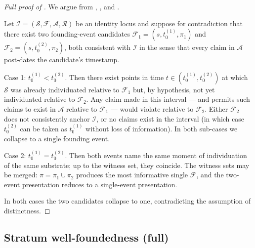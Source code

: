\documentclass[11pt,a4paper,parskip=half-,DIV=12,headings=standardclasses]{scrartcl}
\theoremstyle{ncthm}
\theoremstyle{ncdef}
\newcommand{\identity}{\mathcal{I}}
\newcommand{\substrate}{\mathcal{S}}
\newcommand{\founding}{\mathcal{F}}
\newcommand{\accretion}{\mathcal{A}}
\newcommand{\relations}{\mathcal{R}}
\begin{document}
\begin{proof}[Full proof of ]
We argue from , ,
and .

Let $\identity = (\substrate, \founding, \accretion, \relations)$ be
an identity locus and suppose for contradiction that there exist two
founding-event candidates $\founding_1 = (s, t_0^{(1)}, \pi_1)$ and
$\founding_2 = (s, t_0^{(2)}, \pi_2)$, both consistent with
$\identity$ in the sense that every claim in $\accretion$ post-dates
the candidate's timestamp.

Case 1: $t_0^{(1)} < t_0^{(2)}$. Then there exist points in time
$t \in (t_0^{(1)}, t_0^{(2)})$ at which $\substrate$ was already
individuated relative to $\founding_1$ but, by hypothesis, not yet
individuated relative to $\founding_2$. Any claim made in this
interval --- and  permits such claims to
exist in $\accretion$ relative to $\founding_1$ --- would violate
 relative to $\founding_2$. Either
$\founding_2$ does not consistently anchor $\identity$, or no claims
exist in the interval (in which case $t_0^{(2)}$ can be taken as
$t_0^{(1)}$ without loss of information). In both sub-cases we
collapse to a single founding event.

Case 2: $t_0^{(1)} = t_0^{(2)}$. Then both events name the same
moment of individuation of the same substrate; up to the witness set,
they coincide. The witness sets may be merged: $\pi = \pi_1 \cup
\pi_2$ produces the most informative single $\founding$, and the
two-event presentation reduces to a single-event presentation.

In both cases the two candidates collapse to one, contradicting the
assumption of distinctness.
\end{proof}

\subsection{Stratum well-foundedness (full)}
\end{document}
